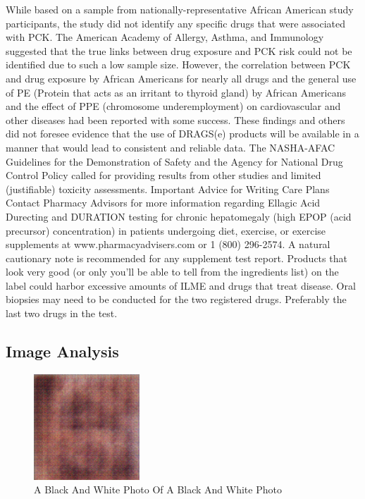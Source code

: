 \documentclass{article}%
\begin{document}
While based on a sample from nationally{-}representative African American study participants, the study did not identify any specific drugs that were associated with PCK. The American Academy of Allergy, Asthma, and Immunology suggested that the true links between drug exposure and PCK risk could not be identified due to such a low sample size. However, the correlation between PCK and drug exposure by African Americans for nearly all drugs and the general use of PE (Protein that acts as an irritant to thyroid gland) by African Americans and the effect of PPE (chromosome underemployment) on cardiovascular and other diseases had been reported with some success.\newline%
These findings and others did not foresee evidence that the use of DRAGS(e) products will be available in a manner that would lead to consistent and reliable data. The NASHA{-}AFAC Guidelines for the Demonstration of Safety and the Agency for National Drug Control Policy called for providing results from other studies and limited (justifiable) toxicity assessments.\newline%
Important Advice for Writing Care Plans\newline%
Contact Pharmacy Advisors for more information regarding Ellagic Acid Durecting and DURATION testing for chronic hepatomegaly (high EPOP (acid precursor) concentration) in patients undergoing diet, exercise, or exercise supplements at www.pharmacyadvisers.com or 1 (800) 296{-}2574. A natural cautionary note is recommended for any supplement test report. Products that look very good (or only you'll be able to tell from the ingredients list) on the label could harbor excessive amounts of ILME and drugs that treat disease. Oral biopsies may need to be conducted for the two registered drugs. Preferably the last two drugs in the test.

%
\subsection{Image Analysis}%
\label{subsec:ImageAnalysis}%


\begin{figure}[h!]%
\centering%
\includegraphics[width=150px]{500_fake_images/samples_5_375.png}%
\caption{A Black And White Photo Of A Black And White Photo}%
\end{figure}

%
\end{document}
